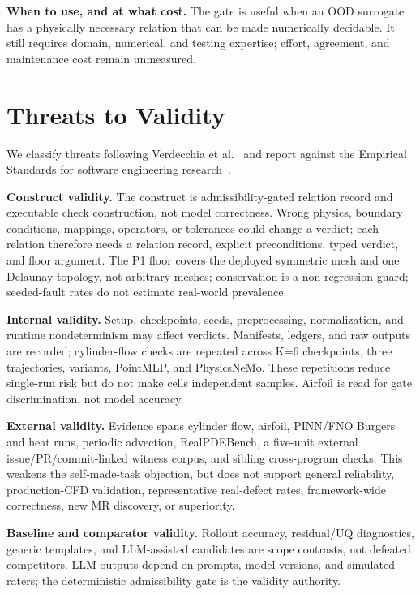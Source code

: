 \documentclass[preprint,12pt,authoryear]{elsarticle}
\begin{document}
\textbf{When to use, and at what cost.} The gate is useful when an OOD surrogate has a physically necessary relation that can be made numerically decidable. It still requires domain, numerical, and testing expertise; effort, agreement, and maintenance cost remain unmeasured.

\section{Threats to Validity}
\label{sec:threats}

We classify threats following Verdecchia et al.~\citep{verdecchia2023threats} and report against the Empirical Standards for software engineering research~\citep{ralph2021empirical}.

\textbf{Construct validity.} The construct is admissibility-gated relation record and executable check construction, not model correctness. Wrong physics, boundary conditions, mappings, operators, or tolerances could change a verdict; each relation therefore needs a relation record, explicit preconditions, typed verdict, and floor argument. The P1 floor covers the deployed symmetric mesh and one Delaunay topology, not arbitrary meshes; conservation is a non-regression guard; seeded-fault rates do not estimate real-world prevalence.

\textbf{Internal validity.} Setup, checkpoints, seeds, preprocessing, normalization, and runtime nondeterminism may affect verdicts. Manifests, ledgers, and raw outputs are recorded; cylinder-flow checks are repeated across K=6 checkpoints, three trajectories, variants, PointMLP, and PhysicsNeMo. These repetitions reduce single-run risk but do not make cells independent samples. Airfoil is read for gate discrimination, not model accuracy.

\textbf{External validity.} Evidence spans cylinder flow, airfoil, PINN/FNO Burgers and heat runs, periodic advection, RealPDEBench, a five-unit external issue/PR/commit-linked witness corpus, and sibling cross-program checks. This weakens the self-made-task objection, but does not support general reliability, production-CFD validation, representative real-defect rates, framework-wide correctness, new MR discovery, or superiority.

\textbf{Baseline and comparator validity.} Rollout accuracy, residual/UQ diagnostics, generic templates, and LLM-assisted candidates are scope contrasts, not defeated competitors. LLM outputs depend on prompts, model versions, and simulated raters; the deterministic admissibility gate is the validity authority.
\end{document}
